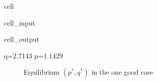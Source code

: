 \documentclass[letterpaper,10pt,english]{jupyterBook}
\begin{document}
\begin{sphinxuseclass}{cell}\begin{sphinxVerbatimInput}

\begin{sphinxuseclass}{cell_input}
\begin{sphinxVerbatim}[commandchars=\\\{\}]
   
   
  \PYG{p}{[}\PYG{p}{[} \PYG{p}{]}
     \PYG{p}{[} \PYG{p}{]}\PYG{p}{]}
  \PYG{p}{[} \PYG{p}{]}
     
\end{sphinxVerbatim}

\end{sphinxuseclass}\end{sphinxVerbatimInput}
\begin{sphinxVerbatimOutput}

\begin{sphinxuseclass}{cell_output}
\begin{sphinxVerbatim}[commandchars=\\\{\}]
q=2.7143 p=1.1429
\end{sphinxVerbatim}

\end{sphinxuseclass}\end{sphinxVerbatimOutput}

\end{sphinxuseclass}
\begin{figure}[htbp]
\centering
\capstart

\noindent{}
\caption{Equilibrium \((p^*, q^*)\) in the one good case}\label{\detokenize{05.linear_algebra:id15}}\end{figure}
\end{document}
